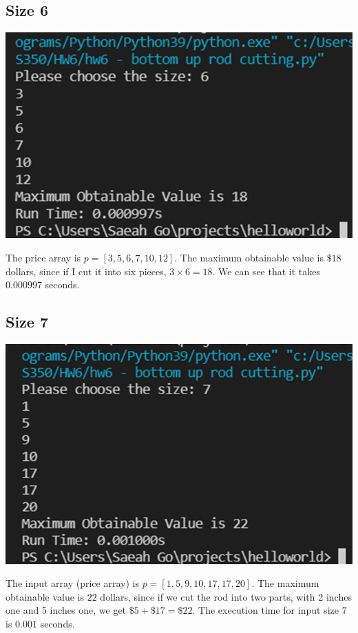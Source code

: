 \documentclass{article}
\begin{document}
\subsection{\textbf{Size 6}}
\begin{center}
\includegraphics[scale = 0.7]{size 6.png} \\
\end{center}
The price array is $p = [3, 5, 6, 7, 10, 12]$. The maximum obtainable value is $\$18$ dollars, since if I cut it into six pieces, $3 \times 6 = 18$. We can see that it takes $0.000997$ seconds.

\subsection{\textbf{Size 7}} 
\begin{center}
\includegraphics[scale = 0.7]{size 7.png} \\
\end{center}
The input array (price array) is $p = [1, 5, 9, 10, 17, 17, 20]$. The maximum obtainable value is $22$ dollars, since if we cut the rod into two parts, with 2 inches one and 5 inches one, we get $\$5 + \$17 = \$22.$ The execution time for input size $7$ is $0.001$ seconds.
\end{document}
